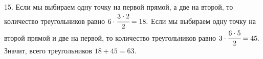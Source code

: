 15. Если мы выбираем одну точку на первой прямой, а две на второй, то количество треугольников равно $6\cdot\cfrac{3\cdot2}{2}=18.$ Если мы выбираем одну точку на второй прямой и две на первой, то количество треугольников равно $3\cdot\cfrac{6\cdot5}{2}=45.$ Значит, всего треугольников $18+45=63.$\\
